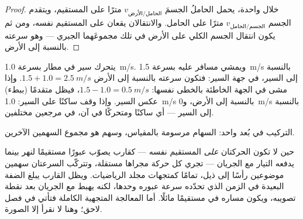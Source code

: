 \begin{proof}
خلال  واحدة، يحمل الحاملُ الجسمَ $v_{\text{الحامل/الأرض}}$
مترًا على المستقيم، ويتقدم الجسم $v_{\text{الجسم/الحامل}}$
مترًا على الحامل. والانتقالان يقعان على المستقيم نفسه،
ومن ثم يكون انتقال الجسم الكلي على الأرض في تلك  مجموعَهما
الجبري --- وهو سرعته بالنسبة إلى الأرض.
\end{proof}

\begin{example}\label{ex:g10:relative-motion:walkway}
يتحرك سير في مطار بسرعة \qty{1.0}{m/s}. ويمشي مسافر عليه بسرعة
\qty{1.5}{m/s} بالنسبة إلى السير، في جهة السير: فتكون سرعته
بالنسبة إلى الأرض $1.5 + 1.0 = \qty{2.5}{m/s}$. وإذا مشى في الجهة
الخاطئة بالخطى نفسها: $1.5 - 1.0 = \qty{0.5}{m/s}$، فيظل متقدمًا (ببطء)
عكس السير. وإذا وقف ساكنًا على السير:
\qty{1.0}{m/s} بالنسبة إلى الأرض، و\qty{0}{m/s} بالنسبة إلى
السير --- أي ساكنًا ومتحركًا في آن، في مرجعين
مختلفين.
\end{example}

\begin{omfigure}

{\small التركيب في بُعد واحد: السهام مرسومة بالمقياس،
وسهم  هو مجموع السهمين الآخرين.}
\end{omfigure}

\begin{remark}[اتجاهان في آن]\label{rem:g10:relative-motion:twodim}
حين لا تكون الحركتان \emph{على} المستقيم نفسه --- كقارب يصوّب
عبورًا مستقيمًا لنهر بينما يدفعه التيار مع الجريان --- تجري كل
حركة مجراها مستقلة، وتتركّب السرعتان
سهمين موضوعين رأسًا إلى ذيل، تمامًا كمتجهات مجلد
الرياضيات. ويظل القارب يبلغ الضفة البعيدة في الزمن الذي تحدّده
سرعة عبوره وحدها، لكنه يهبط مع الجريان بعد نقطة تصويبه،
ويكون مساره في  مستقيمًا مائلًا. أما المعالجة المتجهية
الكاملة فتأتي في فصل لاحق؛ وهنا لا نقرأ إلا الصورة.
\end{remark}


